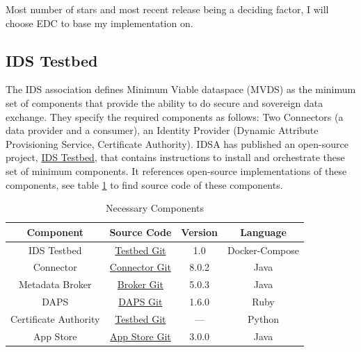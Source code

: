 \documentclass{article}
\begin{document}
Most number of stars and most recent release being a deciding factor, I will choose EDC to base my implementation on.

\subsection*{IDS Testbed}
The IDS association defines Minimum Viable dataspace (MVDS) as the minimum set of components that provide the ability to do secure and sovereign data exchange. They specify the required components as follows: Two Connectors (a data provider and a consumer), an Identity Provider (Dynamic Attribute Provisioning Service, Certificate Authority). IDSA has published an open-source project, \href{https://github.com/International-Data-Spaces-Association/IDS-testbed}{IDS Testbed}, that contains instructions to install and orchestrate these set of minimum components. It references open-source implementations of these components, see table \ref{tab:components} to find source code of these components.

\begin{table}[ht]
    \label{tab:components}
    \centering
    \begin{tabular}{|c|c|c|c|}
    \hline
    \textbf{Component} & \textbf{Source Code} & \textbf{Version} & \textbf{Language} \\
    \hline
    IDS Testbed & \href{https://github.com/International-Data-Spaces-Association/IDS-testbed}{Testbed Git} & 1.0 & Docker-Compose \\
    \hline
    Connector & \href{https://github.com/International-Data-Spaces-Association/DataspaceConnector/tree/v8.0.2}{Connector Git} & 8.0.2 & Java \\
    \hline
    Metadata Broker & \href{https://github.com/International-Data-Spaces-Association/metadata-broker-open-core}{Broker Git} & 5.0.3 & Java \\
    \hline
    DAPS & \href{https://github.com/International-Data-Spaces-Association/omejdn-daps}{DAPS Git} & 1.6.0 & Ruby \\
    \hline
    Certificate Authority & \href{https://github.com/International-Data-Spaces-Association/IDS-testbed/tree/master/CertificateAuthority}{Testbed Git} & --- & Python \\
    \hline
    App Store & \href{https://github.com/International-Data-Spaces-Association/IDS-AppStore}{App Store Git} & 3.0.0 & Java \\
    \hline
    \end{tabular}
    \caption{Necessary Components}
\end{table}
\end{document}
